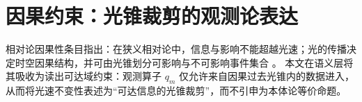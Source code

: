\section{因果约束：光锥裁剪的观测论表达}

相对论因果性条目指出：在狭义相对论中，信息与影响不能超越光速；光的传播决定时空因果结构，并可由光锥划分可影响与不可影响事件集合 \cite{EinsteinOnlineCausal}。
本文在语义层将其吸收为读出可达域约束：观测算子 $q_m$ 仅允许来自因果过去光锥内的数据进入，从而将光速不变性表述为“可达信息的光锥裁剪”，而不引申为本体论等价命题。

